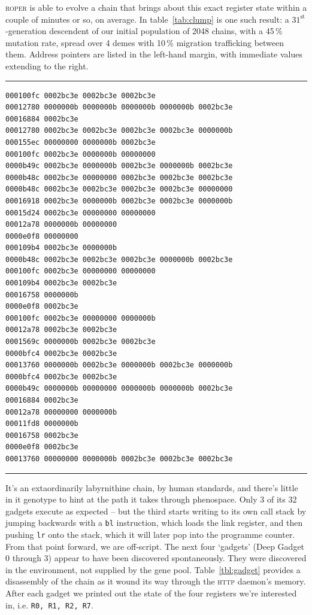 \textsc{roper} is able to evolve a chain that brings about this
exact register state within a couple of minutes or so, on
average. In table~\ref{tab:clump} is one such result: a
$31^{\textrm{st}}$-generation descendent of our initial
population of 2048 chains, with a 45\,\% mutation rate, spread over
4 demes with 10\,\% migration trafficking between them. Address
pointers are listed in the left-hand margin, with immediate
values extending to the right. 
\begin{table}
  \hrule
  {\tiny
\begin{verbatim}
000100fc 0002bc3e 0002bc3e 0002bc3e 
00012780 0000000b 0000000b 0000000b 0000000b 0002bc3e 
00016884 0002bc3e 
00012780 0002bc3e 0002bc3e 0002bc3e 0002bc3e 0000000b 
000155ec 00000000 0000000b 0002bc3e 
000100fc 0002bc3e 0000000b 00000000 
0000b49c 0002bc3e 0000000b 0002bc3e 0000000b 0002bc3e 
0000b48c 0002bc3e 00000000 0002bc3e 0002bc3e 0002bc3e 
0000b48c 0002bc3e 0002bc3e 0002bc3e 0002bc3e 00000000 
00016918 0002bc3e 0000000b 0002bc3e 0002bc3e 0000000b 
00015d24 0002bc3e 00000000 00000000 
00012a78 0000000b 00000000 
0000e0f8 00000000 
000109b4 0002bc3e 0000000b 
0000b48c 0002bc3e 0002bc3e 0002bc3e 0000000b 0002bc3e 
000100fc 0002bc3e 00000000 00000000 
000109b4 0002bc3e 0002bc3e 
00016758 0000000b 
0000e0f8 0002bc3e 
000100fc 0002bc3e 00000000 0000000b 
00012a78 0002bc3e 0002bc3e 
0001569c 0000000b 0002bc3e 0002bc3e 
0000bfc4 0002bc3e 0002bc3e 
00013760 0000000b 0002bc3e 0000000b 0002bc3e 0000000b 
0000bfc4 0002bc3e 0002bc3e 
0000b49c 0000000b 00000000 0000000b 0000000b 0002bc3e 
00016884 0002bc3e 
00012a78 00000000 0000000b 
00011fd8 0000000b 
00016758 0002bc3e 
0000e0f8 0002bc3e 
00013760 00000000 0000000b 0002bc3e 0002bc3e 0002bc3e 
\end{verbatim}
  }
\hrule
\caption{Contents of a successful payload: address pointers on
the left-hand margin, literals extending to the right. Each row
is a `clump'.}
\label{tab:clump}
\end{table}

It's an extaordinarily labyrnithine chain, by human standards,
and there's little in it genotype to hint at the path it takes
through phenospace. Only 3 of its 32 gadgets execute as expected -- but the
third starts writing to its own call stack by jumping
backwards with a \texttt{bl} instruction, which loads the link
register, and then pushing \texttt{lr} onto the stack, which it will later pop into
the programme counter. From that point forward, we are
off-script.  The next four `gadgets' (Deep Gadget 0 through 3)
appear to have been discovered spontaneously. They were
discovered in the environment, not supplied by the gene pool. 
Table~\ref{tbl:gadget} provides a
disassembly of the chain as it wound its way through the
\textsc{http} daemon's memory. After each gadget we printed
out the state of the four registers we're interested in, i.e. \texttt{R0, R1, R2, R7}.
 
